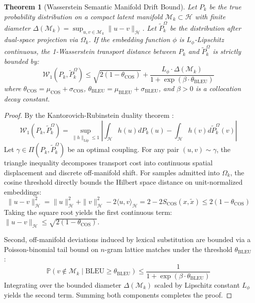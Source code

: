 \documentclass[final,5p,times,twocolumn]{elsarticle}
\newtheorem{theorem}{Theorem}
\begin{document}
\begin{theorem}[Wasserstein Semantic Manifold Drift Bound]
\label{thm:wasserstein_bound}
Let $P_k$ be the true probability distribution on a compact latent manifold $\mathcal{M}_k \subset \mathcal{H}$ with finite diameter $\Delta(\mathcal{M}_k) = \sup_{u, v \in \mathcal{M}_k} \|u - v\|_\mathcal{H}$. Let $\tilde{P}_k^\Omega$ be the distribution after dual-space projection via $\Omega_k$. If the embedding function $\phi$ is $L_\phi$-Lipschitz continuous, the 1-Wasserstein transport distance between $P_k$ and $\tilde{P}_k^\Omega$ is strictly bounded by:
\begin{equation}
    \mathcal{W}_1(P_k, \tilde{P}_k^\Omega) \le \sqrt{2\left(1 - \theta_{\text{COS}}\right)} + \frac{L_\phi \cdot \Delta(\mathcal{M}_k)}{1 + \exp\left(\beta \cdot \theta_{\text{BLEU}}\right)}
\end{equation}
where $\theta_{\text{COS}} = \mu_{\text{COS}} + \sigma_{\text{COS}}$, $\theta_{\text{BLEU}} = \mu_{\text{BLEU}} + \sigma_{\text{BLEU}}$, and $\beta > 0$ is a collocation decay constant.
\end{theorem}

\begin{proof}
By the Kantorovich-Rubinstein duality theorem \cite{peyre2019computational}:
\begin{equation}
    \mathcal{W}_1(P_k, \tilde{P}_k^\Omega) = \sup_{\|h\|_{\text{Lip}} \le 1} \left| \int_{\mathcal{H}} h(u) dP_k(u) - \int_{\mathcal{H}} h(v) d\tilde{P}_k^\Omega(v) \right|
\end{equation}
Let $\gamma \in \Pi(P_k, \tilde{P}_k^\Omega)$ be an optimal coupling. For any pair $(u, v) \sim \gamma$, the triangle inequality decomposes transport cost into continuous spatial displacement and discrete off-manifold shift. For samples admitted into $\Omega_k$, the cosine threshold directly bounds the Hilbert space distance on unit-normalized embeddings:
\begin{equation}
    \|u - v\|_\mathcal{H}^2 = \|u\|_\mathcal{H}^2 + \|v\|_\mathcal{H}^2 - 2 \langle u, v \rangle_\mathcal{H} = 2 - 2 S_{\text{COS}}(x, \tilde{x}) \le 2(1 - \theta_{\text{COS}})
\end{equation}
Taking the square root yields the first continuous term: $\|u - v\|_\mathcal{H} \le \sqrt{2(1 - \theta_{\text{COS}})}$.

Second, off-manifold deviations induced by lexical substitution are bounded via a Poisson-binomial tail bound on $n$-gram lattice matches under the threshold $\theta_{\text{BLEU}}$:
\begin{equation}
    \mathbb{P}\left(v \notin \mathcal{M}_k \mid \text{BLEU} \ge \theta_{\text{BLEU}}\right) \le \frac{1}{1 + \exp(\beta \cdot \theta_{\text{BLEU}})}
\end{equation}
Integrating over the bounded diameter $\Delta(\mathcal{M}_k)$ scaled by Lipschitz constant $L_\phi$ yields the second term. Summing both components completes the proof.
\end{proof}
\end{document}
